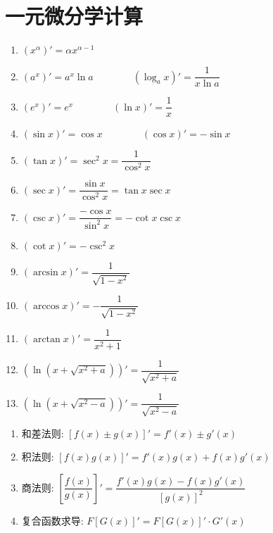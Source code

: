 \section{一元微分学计算}
\begin{theorem}[基本求导公式]
	\begin{enumerate}
		\item $(x^{\alpha})'= \alpha x^{\alpha-1}$
		\item $(a^{x})'= a^{x}\ln a \qquad\qquad (\log_{a}x)'= \dfrac{1}{x\ln a}$
		\item $(e^{x})'= e^{x}\qquad \qquad (\ln x)' = \dfrac{1}{x}$
		\item $(\sin x)' = \cos x\qquad \qquad (\cos x)' = -\sin x$
		\item $(\tan x)' = \sec^{2} x = \dfrac{1}{\cos^{2} x}$
		\item $(\sec x)' = \dfrac{\sin x}{\cos^{2}x} = \tan x\sec x$
		\item $(\csc x)' = \dfrac{-\cos x}{\sin^{2} x} = -\cot x\csc x$
		\item $(\cot x)' = -\csc^{2} x$
		\item $(\arcsin x)' = \dfrac{1}{\sqrt{1-x^{2}}}$
		\item $(\arccos x)' = -\dfrac{1}{\sqrt{1-x^{2}}}$
		\item $(\arctan x)' = \dfrac{1}{x^{2}+1}$
		\item $\left(\ln(x+\sqrt{x^{2}+a})\right)' = \dfrac{1}{\sqrt{x^{2}+a}}$
		\item $\left(\ln(x+\sqrt{x^{2}-a})\right)' = \dfrac{1}{\sqrt{x^{2}-a}}$
	\end{enumerate}
\end{theorem}

\begin{theorem}[导数四则运算]
	\begin{enumerate}
		\item 和差法则: $[f(x)\pm g(x)]' = f'(x) \pm g'(x)$
		\item 积法则: $[f(x)g(x)]' = f'(x)g(x) + f(x)g'(x)$
		\item 商法则: $\left[\dfrac{f(x)}{g(x)}\right]' = \dfrac{f'(x)g(x) - f(x)g'(x)}{[g(x)]^{2}}$
		\item 复合函数求导: $F[G(x)]' = F[G(x)]'\cdot G'(x)$
	\end{enumerate}
\end{theorem}

